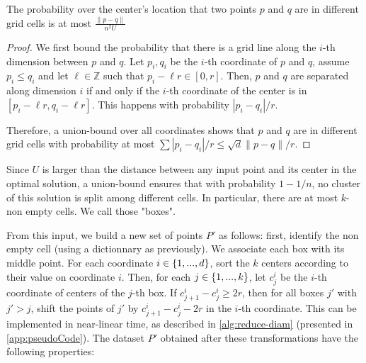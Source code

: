 \begin{lemma}\label{lem:quadtreeSep}
The probability over the center's location that two points $p$ and $q$ are in different grid cells is at most $\frac{\|p-q\|}{n^2 U}$
\end{lemma}
\begin{proof}
We first bound the probability that there is a grid line along the $i$-th dimension between $p$ and $q$. Let $p_i, q_i$ be the $i$-th coordinate of $p$ and $q$, assume $p_i \leq q_i$ and let $\ell \in \mathbb{Z}$ such that $p_i - \ell r \in [0, r]$. 
Then, $p$ and $q$ are separated along dimension $i$ if and only if the $i$-th coordinate of the center is in $[p_i - \ell r, q_i - \ell r]$. This happens with probability $|p_i - q_i|/r$. 

Therefore, a union-bound over all coordinates shows that $p$ and $q$ are in different grid cells with probability at most $\sum |p_i-q_i| / r \leq \sqrt{d} \|p-q\|/r$.
\end{proof}

Since $U$ is larger than the distance between any input point and its center in the optimal solution, a union-bound ensures that with probability $1-1/n$, no
cluster of this solution is split among different cells.  In particular, there are at most $k$-non empty cells. We call those "boxes".

From this input, we build a new set of points $P'$ as follows: first, identify the non empty cell (using a dictionnary as previously). We associate each box with
its middle point.  For each coordinate $i \in \left\{ 1, ..., d \right\}$, sort the $k$ centers according to their value on coordinate $i$. Then, for
each $j \in \left\{ 1, ..., k\right\}$, let $c^i_j$  be the $i$-th coordinate of centers of the $j$-th box. If $c^i_{j+1} - c^i_j
\geq 2r$, then for all boxes $j'$ with $j' > j$, shift the points of $j'$ by $c^i_{j+1} - c^i_j - 2r$ in the $i$-th coordinate. This can be implemented in near-linear time, as described in \cref{alg:reduce-diam} (presented in \cref{app:pseudoCode}). The dataset $P'$ obtained after these transformations have the following properties:


